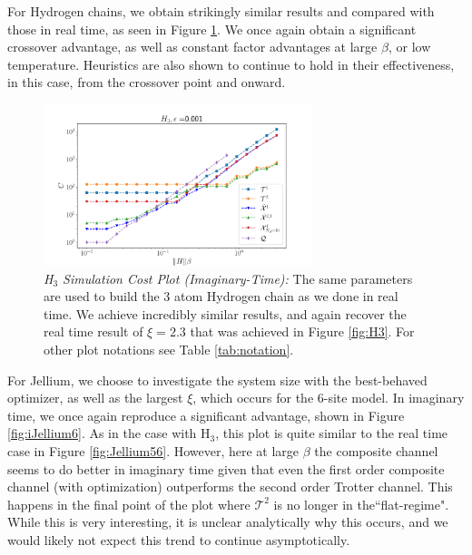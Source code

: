 For Hydrogen chains, we obtain strikingly similar results and compared with those in real time, as seen in Figure \ref{fig:iH3}. We once again obtain a significant crossover advantage, as well as constant factor advantages at large $\beta$, or low temperature. Heuristics are also shown to continue to hold in their effectiveness, in this case, from the crossover point and onward.

\begin{figure}[htbp!]
    \centering
    \includegraphics[width=0.7\textwidth]{composite_numerics/iH3.png}
    \caption{\textit{H$_3$ Simulation Cost Plot (Imaginary-Time):} The same parameters are used to build the 3 atom Hydrogen chain as we done in real time. We achieve incredibly similar results, and again recover the real time result of $\xi = 2.3$ that was achieved in Figure \ref{fig:H3}. For other plot notations see Table \ref{tab:notation}.} \label{fig:iH3}
\end{figure} 
\FloatBarrier

For Jellium, we choose to investigate the system size with the best-behaved optimizer, as well as the largest $\xi$, which occurs for the 6-site model. In imaginary time, we once again reproduce a significant advantage, shown in Figure \ref{fig:iJellium6}. As in the case with {\rm H$_3$}, this plot is quite similar to the real time case in Figure \ref{fig:Jellium56}. However, here at large $\beta$ the composite channel seems to do better in imaginary time given that even the first order composite channel (with optimization) outperforms the second order Trotter channel. This happens in the final point of the plot where $\mathcal{T}^2$ is no longer in the``flat-regime". While this is very interesting, it is unclear analytically why this occurs, and we would likely not expect this trend to continue asymptotically. 

